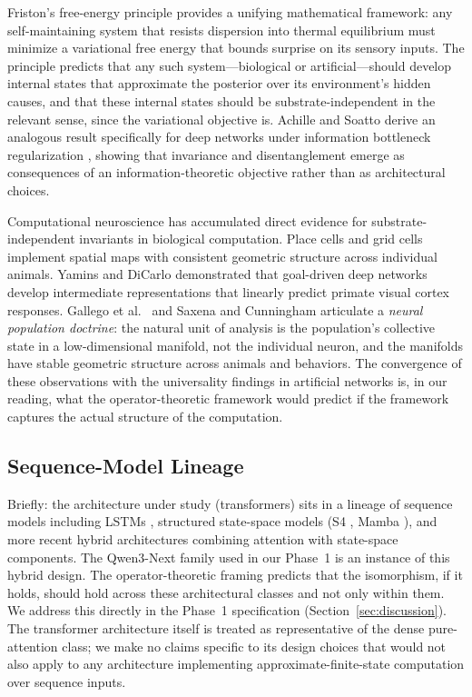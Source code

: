 Friston's free-energy principle \cite{friston2010free} provides a
unifying mathematical framework: any self-maintaining system that
resists dispersion into thermal equilibrium must minimize a variational
free energy that bounds surprise on its sensory inputs. The principle
predicts that any such system---biological or artificial---should
develop internal states that approximate the posterior over its
environment's hidden causes, and that these internal states should be
substrate-independent in the relevant sense, since the variational
objective is. Achille and Soatto \cite{achille2018emergence} derive an
analogous result specifically for deep networks under information
bottleneck regularization \cite{tishby2015deep}, showing that invariance
and disentanglement emerge as consequences of an information-theoretic
objective rather than as architectural choices.

Computational neuroscience has accumulated direct evidence for
substrate-independent invariants in biological computation. Place cells
\cite{okeefe1971hippocampus} and grid cells
\cite{hafting2005microstructure} implement spatial maps with consistent
geometric structure across individual animals. Yamins and DiCarlo
\cite{yamins2016using} demonstrated that goal-driven deep networks
develop intermediate representations that linearly predict primate
visual cortex responses. Gallego et al.~\cite{gallego2017neural} and
Saxena and Cunningham \cite{saxena2019towards} articulate a \emph{neural
population doctrine}: the natural unit of analysis is the population's
collective state in a low-dimensional manifold, not the individual
neuron, and the manifolds have stable geometric structure across
animals and behaviors. The convergence of these observations with the
universality findings in artificial networks is, in our reading, what
the operator-theoretic framework would predict if the framework
captures the actual structure of the computation.

\subsection{Sequence-Model Lineage}

Briefly: the architecture under study (transformers) sits in a lineage
of sequence models including LSTMs \cite{hochreiter1997long}, structured
state-space models (S4 \cite{gu2022s4}, Mamba \cite{gu2024mamba}), and
more recent hybrid architectures combining attention with state-space
components. The Qwen3-Next family used in our Phase~1 is an instance of
this hybrid design. The operator-theoretic framing predicts that the
isomorphism, if it holds, should hold across these architectural classes
and not only within them. We address this directly in the Phase~1
specification (Section~\ref{sec:discussion}). The transformer
architecture itself \cite{vaswani2017attention} is treated as
representative of the dense pure-attention class; we make no claims
specific to its design choices that would not also apply to any
architecture implementing approximate-finite-state computation over
sequence inputs.
